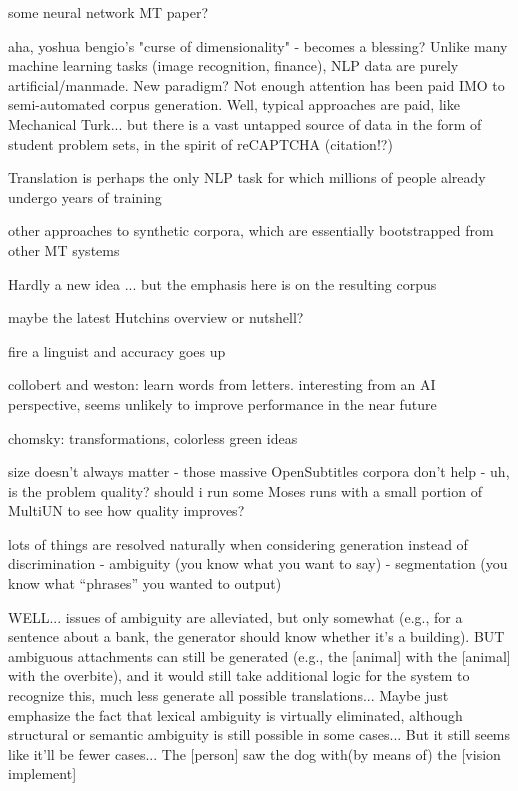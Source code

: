 some neural network MT paper?

aha, yoshua bengio's "curse of dimensionality" - becomes a blessing?  
Unlike many machine learning tasks (image recognition, finance), NLP data are purely artificial/manmade.  New paradigm?  Not enough attention has been paid IMO to semi-automated corpus generation.  Well, typical approaches are paid, like Mechanical Turk... but there is a vast untapped source of data in the form of student problem sets, in the spirit of reCAPTCHA (citation!?)

Translation is perhaps the only NLP task for which millions of people already undergo years of training

other approaches to synthetic corpora, which are essentially bootstrapped from other MT systems

Hardly a new idea ... but the emphasis here is on the resulting corpus




maybe the latest Hutchins overview or nutshell?

fire a linguist and accuracy goes up

collobert and weston: learn words from letters. interesting from an AI perspective, seems unlikely to improve performance in the near future

chomsky: transformations, colorless green ideas


size doesn't always matter - those massive OpenSubtitles corpora don't help
- uh, is the problem quality? should i run some Moses runs with a small portion of MultiUN to see how quality improves?

lots of things are resolved naturally when considering generation instead of discrimination
- ambiguity (you know what you want to say)
- segmentation (you know what ``phrases'' you wanted to output)

WELL... issues of ambiguity are alleviated, but only somewhat (e.g., for a sentence about a bank, the generator should know whether it's a building). 
BUT ambiguous attachments can still be generated (e.g., the [animal] with the [animal] with the overbite), and it would still take additional logic for the system to recognize this, much less generate all possible translations...
Maybe just emphasize the fact that lexical ambiguity is virtually eliminated, although structural or semantic ambiguity is still possible in some cases...
But it still seems like it'll be fewer cases... The [person] saw the dog with(by means of) the [vision implement]


